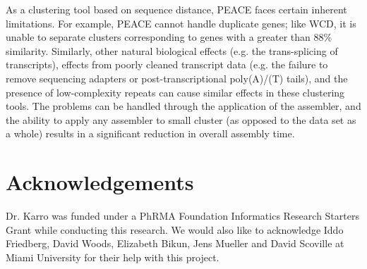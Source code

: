 \documentclass[a4,center,fleqn]{NAR}
\newcommand{\peace} {{\small PEACE}}
\newcommand{\wcd} {{\small WCD}}
\begin{document}
As a clustering tool based on sequence distance, \peace\/ faces
certain inherent limitations. For example, \peace\/ cannot handle
duplicate genes; like \wcd\/, it is unable to separate clusters
corresponding to genes with a greater than 88\% similarity.
Similarly, other natural biological effects (e.g. the trans-splicing of
transcripts), effects from poorly cleaned transcript data (e.g. the
failure to remove sequencing adapters or post-transcriptional
poly(A)/(T) tails), and the presence of low-complexity repeats can
cause similar effects in these clustering tools.  The problems can be
handled through the application of the assembler, and the ability to
apply any assembler to small cluster (as opposed to the data set as a
whole) results in a significant reduction in overall assembly time.

\section{Acknowledgements}

Dr. Karro was funded under a PhRMA Foundation Informatics Research
Starters Grant while conducting this research.  We would also like to
acknowledge Iddo Friedberg, David Woods, Elizabeth Bikun, Jens Mueller and David
Scoville at Miami University for their help with this project.

\vspace{3mm}


\end{document}

